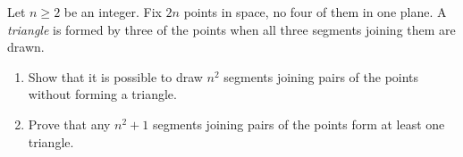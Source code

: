 Let $n\ge2$ be an integer. Fix $2n$ points in space, no four of them in one plane. A \emph{triangle} is formed by three of the points when all three segments joining them are drawn.
\begin{enumerate}
\item[(a)] Show that it is possible to draw $n^2$ segments joining pairs of the points without forming a triangle.
\item[(b)] Prove that any $n^2+1$ segments joining pairs of the points form at least one triangle.
\end{enumerate}
